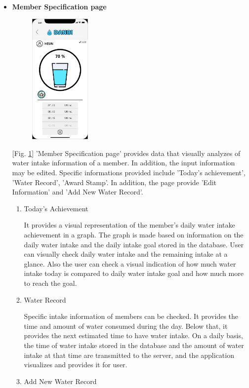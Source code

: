 \documentclass[conference]{IEEEtran}
\begin{document}
\begin{itemize}
\begin{enumerate}
\end{enumerate}
\item \textbf{Member Specification page}

\par \begin{figure}[h!]
\includegraphics[width=3cm]{xd/member specification page.JPG}
\centering
\caption{}
\label{fig:specification}
\end{figure}

[Fig. \ref{fig:specification}] 'Member Specification page' provides data that visually analyzes of water intake information of a member. In addition, the input information may be edited. Specific informations provided include 'Today's achievement', 'Water Record', 'Award Stamp'. In addition, the page provide 'Edit Information' and 'Add New Water Record'.

\begin{enumerate}
\setlength{\parindent}{2ex}
\item Today's Achievement

It provides a visual representation of the member's daily water intake achievement in a graph. The graph is made based on information on the daily water intake and the daily intake goal stored in the database. User can visually check daily water intake and the remaining intake at a glance. Also the user can check a visual indication of how much water intake today is compared to daily water intake goal and how much more to reach the goal.
\item Water Record

Specific intake information of members can be checked. It provides the time and amount of water consumed during the day. Below that, it provides the next estimated time to have water intake. On a daily basis, the time of water intake stored in the database and the amount of water intake at that time are transmitted to the server, and the application visualizes and provides it for user.
\item Add New Water Record


\end{enumerate}
\end{itemize}
\end{document}
